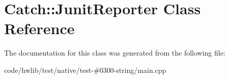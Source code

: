 \hypertarget{classCatch_1_1JunitReporter}{}\section{Catch\+:\+:Junit\+Reporter Class Reference}
\label{classCatch_1_1JunitReporter}


The documentation for this class was generated from the following file\+:\begin{DoxyCompactItemize}
\item 
code/hwlib/test/native/test-\/\#0300-\/string/main.\+cpp\end{DoxyCompactItemize}
